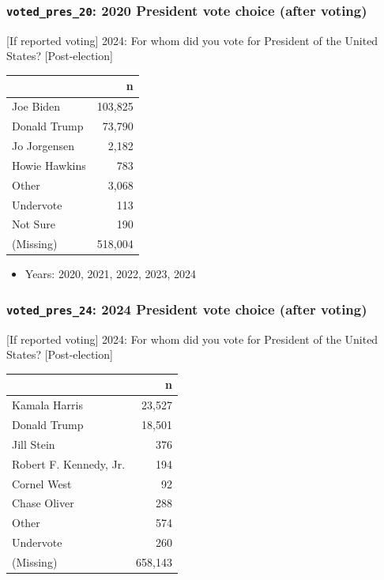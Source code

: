 \documentclass[10pt,article,oneside]{memoir}
\begin{document}
\subsubsection{\texorpdfstring{\texttt{voted\_pres\_20}: 2020 President
vote choice (after
voting)}{voted\_pres\_20: 2020 President vote choice (after voting)}}\label{voted_pres_20-2020-president-vote-choice-after-voting}

{[}If reported voting{]} 2024: For whom did you vote for President of
the United States? {[}Post-election{]}

\begin{table}[H]
\centering
\begin{tabular}[t]{lr}
\toprule
 & n\\
\midrule
Joe Biden & 103,825\\
Donald Trump & 73,790\\
Jo Jorgensen & 2,182\\
Howie Hawkins & 783\\
Other & 3,068\\
Undervote & 113\\
Not Sure & 190\\
(Missing) & 518,004\\
\bottomrule
\end{tabular}
\end{table}

\begin{itemize}
\tightlist
\item
  Years: 2020, 2021, 2022, 2023, 2024
\end{itemize}

\subsubsection{\texorpdfstring{\texttt{voted\_pres\_24}: 2024 President
vote choice (after
voting)}{voted\_pres\_24: 2024 President vote choice (after voting)}}\label{voted_pres_24-2024-president-vote-choice-after-voting}

{[}If reported voting{]} 2024: For whom did you vote for President of
the United States? {[}Post-election{]}

\begin{table}[H]
\centering
\begin{tabular}[t]{lr}
\toprule
 & n\\
\midrule
Kamala Harris & 23,527\\
Donald Trump & 18,501\\
Jill Stein & 376\\
Robert F. Kennedy, Jr. & 194\\
Cornel West & 92\\
Chase Oliver & 288\\
Other & 574\\
Undervote & 260\\
(Missing) & 658,143\\
\bottomrule
\end{tabular}
\end{table}
\end{document}
